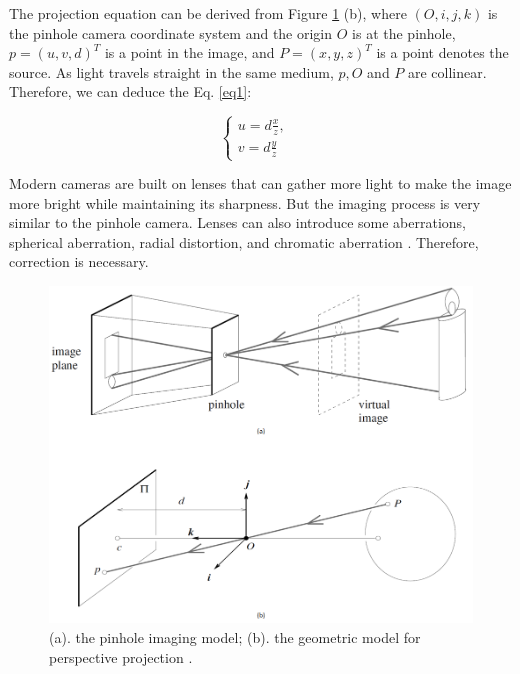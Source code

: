 \documentclass[a4paper,12pt]{article}
\begin{document}
The projection equation can be derived from Figure \ref{figure:camera} (b), where $ (O, i, j, k) $ is the pinhole camera coordinate system and the origin $O$ is at the pinhole,  $p=(u, v, d)^T$ is a point in the image, and   $P=(x, y, z)^T$ is a point denotes the source. As light travels straight in the same medium, $p, O$ and $P$ are collinear. Therefore, we can deduce the Eq. \ref{eq1}: 

\begin{equation}
\label{eq1}
	\begin{cases}
	u = d\frac{x}{z}, & \\    
	v = d\frac{y}{z}   
	\end{cases}
\end{equation}

Modern cameras are built on lenses that can gather more light to make the image more bright while maintaining its sharpness. But the imaging process is very similar to the pinhole camera. Lenses can also introduce some aberrations, \eg spherical aberration, radial distortion, and chromatic aberration \cite{Forsyth:2002:CVM:580035}. Therefore, correction is necessary.

\begin{figure}[h]		
	\includegraphics[width=1\textwidth]{camera.png}
	\caption[The pinhole camera model and perspective projection.]{(a). the pinhole imaging model; (b). the geometric model for perspective projection \cite{Forsyth:2002:CVM:580035}.}
	\centering
	\label{figure:camera}
\end{figure}
\end{document}
